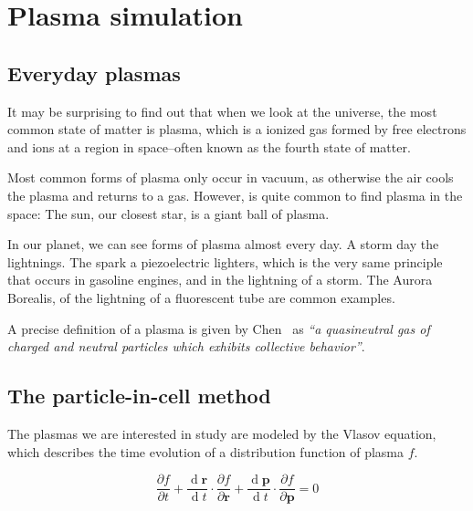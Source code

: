 \chapter{Plasma simulation}
\label{ch:plasma-sim}



\section{Everyday plasmas}

It may be surprising to find out that when we look at the universe, the most
common state of matter is plasma, which is a ionized gas formed by free
electrons and ions at a region in space--often known as the fourth state of
matter.

Most common forms of plasma only occur in vacuum, as otherwise the air cools the
plasma and returns to a gas. However, is quite common to find plasma in the 
space: The sun, our closest star, is a giant ball of plasma.

In our planet, we can see forms of plasma almost every day. A storm day the
lightnings. The spark a piezoelectric lighters, which is the very same
principle that occurs in gasoline engines, and in the lightning of a storm.
The Aurora Borealis, of the lightning of a fluorescent tube are common examples.

A precise definition of a plasma is given by Chen~\cite{chen} as \textit{``a
quasineutral gas of charged and neutral particles which exhibits collective
behavior''}.


\section{The particle-in-cell method}

The plasmas we are interested in study are modeled by the Vlasov equation, which 
describes the time evolution of a distribution function of plasma $f$.

\begin{equation}
{\frac {\partial f}{\partial t}}+{\frac {\operatorname {d} \mathbf {r} 
}{\operatorname {d} t}}\cdot {\frac {\partial f}{\partial \mathbf {r} }}+{\frac 
{\operatorname {d} \mathbf {p} }{\operatorname {d} t}}\cdot {\frac {\partial 
f}{\partial \mathbf {p} }}=0
\end{equation}

